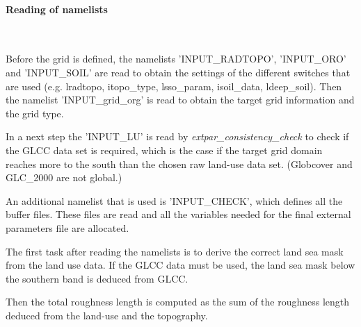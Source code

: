 \documentclass[a4paper,10pt,DIV14,BCOR1cm,titlepage,twoside]{scrartcl}
\begin{document}
\paragraph{Reading of namelists}\ \par\medskip\noindent
Before the grid is defined, the namelists 'INPUT\_RADTOPO', 'INPUT\_ORO' and 'INPUT\_SOIL' are read to obtain the settings of the different switches that are used (e.g. lradtopo, itopo\_type, lsso\_param, isoil\_data, ldeep\_soil). Then the namelist 'INPUT\_grid\_org' is read to obtain the target grid information and the grid type.\par\medskip\noindent
In a next step the 'INPUT\_LU' is read by \textit{extpar\_consistency\_check} to check if the GLCC data set is required, which is the case if the target grid domain reaches more to the south than the chosen raw land-use data set. (Globcover and GLC\_2000 are not global.)\par\medskip\noindent
An additional namelist that is used is 'INPUT\_CHECK', which defines all the buffer files. These files are read and all the variables needed for the final external parameters file are allocated.\par\medskip\noindent
The first task after reading the namelists is to derive the correct land sea mask from the land use data. If the GLCC data must be used, the land sea mask below the southern band is deduced from GLCC.\par\medskip\noindent
Then the total roughness length is computed as the sum of the roughness length deduced from the land-use and the topography.\par\medskip\noindent
\end{document}
